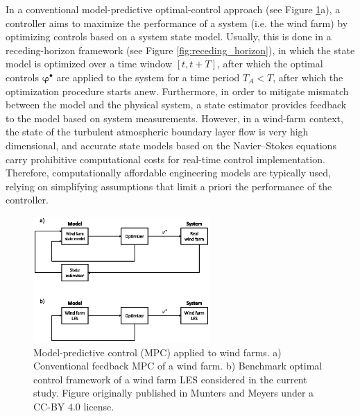 \documentclass[energies,article,submit,moreauthors,latex,10pt,a4paper]{mdpi}
\newcommand{\bs}[1]{\boldsymbol{#1}}
\begin{document}
In a conventional model-predictive optimal-control approach (see Figure \ref{fig:block_diag}a), a controller aims to maximize the performance of a system (i.e. the wind farm) by optimizing controls based on a system state model. Usually, this is done in a receding-horizon framework (see Figure \ref{fig:receding_horizon}), in which the state model is optimized over a time window $[t, t+T]$, after which the optimal controls $\bs{\varphi}^\bullet$ are applied to the system for a time period $T_A < T$, after which the optimization procedure starts anew. Furthermore, in order to mitigate mismatch between the model and the physical system, a state estimator provides feedback to the model based on system measurements. However, in a wind-farm context, the state of the turbulent atmospheric boundary layer flow is very high dimensional, and accurate state models based on the Navier--Stokes equations carry prohibitive computational costs for real-time control implementation. Therefore, computationally affordable engineering models are typically used, relying on simplifying assumptions that limit a priori the performance of the controller. 

\begin{figure}
	\centering
	\includegraphics[width=0.6\textwidth]{figure1}
	\caption{Model-predictive control (MPC) applied to wind farms. a) Conventional feedback MPC of a wind farm. b) Benchmark optimal control framework of a wind farm LES considered in the current study. Figure originally published in Munters and Meyers \cite{munters2017optimal} under a CC-BY 4.0 license.}\label{fig:block_diag}
\end{figure}
\end{document}

